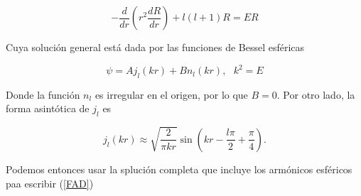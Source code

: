 \begin{equation}
-\frac{d}{dr} \left(r^2 \frac{d R}{dr} \right) +  l (l + 1) R = E R
\end{equation}

Cuya solución general está dada por las funciones de Bessel esféricas

\begin{equation*}
\psi=A j_l(k r) + B n_l(kr), ~~~ k^2=E
\end{equation*}

Donde la función $n_l$ es irregular en el origen, por lo que $B=0$. Por otro lado, la forma asintótica de $j_l$ es

\begin{equation*}
j_l(k r) \approx \sqrt{\frac{2}{\pi k r}} \sin \left(kr-\frac{l \pi}{2} + \frac{\pi}{4}\right).
\end{equation*}

Podemos entonces usar la splución completa que incluye los armónicos esféricos paa escribir (\ref{FAD})
